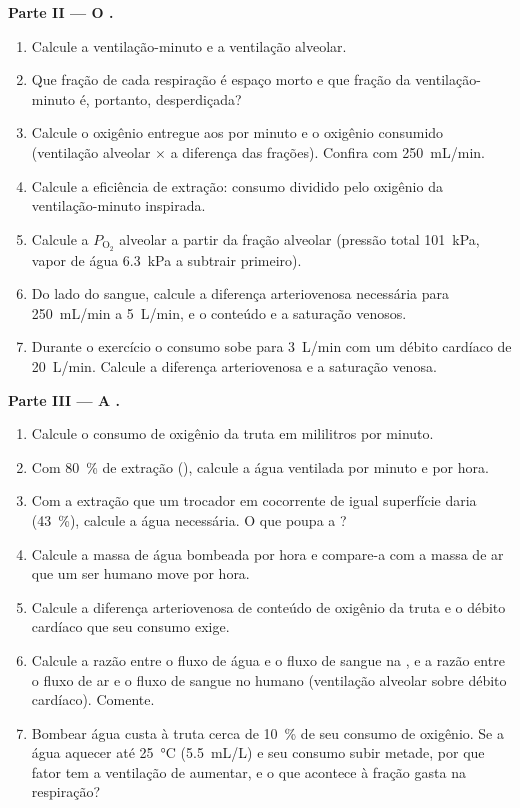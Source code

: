 \begin{problem}
\medskip
\noindent\textbf{Parte II --- O .}
\begin{enumerate}[resume]
  \item Calcule a ventilação-minuto e a ventilação alveolar.
  \item Que fração de cada respiração é espaço morto e que fração da
        ventilação-minuto é, portanto, desperdiçada?
  \item Calcule o oxigênio entregue aos  por minuto e o
        oxigênio consumido (ventilação alveolar $\times$ a diferença
        das frações). Confira com \qty{250}{mL/min}.
  \item Calcule a eficiência de extração: consumo dividido pelo
        oxigênio da ventilação-minuto inspirada.
  \item Calcule a $P_{\mathrm{O_2}}$ alveolar a partir da fração
        alveolar (pressão total \qty{101}{kPa}, vapor de água
        \qty{6.3}{kPa} a subtrair primeiro).
  \item Do lado do sangue, calcule a diferença arteriovenosa
        necessária para \qty{250}{mL/min} a \qty{5}{L/min}, e o
        conteúdo e a saturação venosos.
  \item Durante o exercício o consumo sobe para \qty{3}{L/min} com um
        débito cardíaco de \qty{20}{L/min}. Calcule a diferença
        arteriovenosa e a saturação venosa.
\end{enumerate}

\medskip
\noindent\textbf{Parte III --- A .}
\begin{enumerate}[resume]
  \item Calcule o consumo de oxigênio da truta em mililitros por
        minuto.
  \item Com \qty{80}{\%} de extração (), calcule a água
        ventilada por minuto e por hora.
  \item Com a extração que um trocador em cocorrente de igual
        superfície daria (\qty{43}{\%}), calcule a água necessária. O
        que poupa a ?
  \item Calcule a massa de água bombeada por hora e compare-a com a
        massa de ar que um ser humano move por hora.
  \item Calcule a diferença arteriovenosa de conteúdo de oxigênio da
        truta e o débito cardíaco que seu consumo exige.
  \item Calcule a razão entre o fluxo de água e o fluxo de sangue na
        , e a razão entre o fluxo de ar e o fluxo de sangue no
         humano (ventilação alveolar sobre débito cardíaco).
        Comente.
  \item Bombear água custa à truta cerca de \qty{10}{\%} de seu
        consumo de oxigênio. Se a água aquecer até \qty{25}{\celsius}
        (\qty{5.5}{mL/L}) e seu consumo subir metade, por que fator
        tem a ventilação de aumentar, e o que acontece à fração gasta
        na respiração?
\end{enumerate}


\end{problem}
